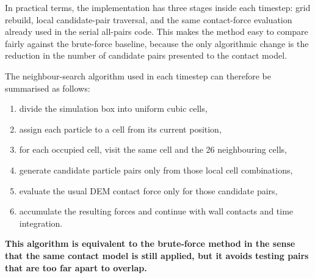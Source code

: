 \documentclass[conference]{IEEEtran}
\begin{document}
In practical terms, the implementation has three stages inside each timestep: grid rebuild, local candidate-pair traversal, and the same contact-force evaluation already used in the serial all-pairs code. This makes the method easy to compare fairly against the brute-force baseline, because the only algorithmic change is the reduction in the number of candidate pairs presented to the contact model.

The neighbour-search algorithm used in each timestep can therefore be summarised as follows:
\begin{enumerate}
\item divide the simulation box into uniform cubic cells,
\item assign each particle to a cell from its current position,
\item for each occupied cell, visit the same cell and the 26 neighbouring cells,
\item generate candidate particle pairs only from those local cell combinations,
\item evaluate the usual DEM contact force only for those candidate pairs,
\item accumulate the resulting forces and continue with wall contacts and time integration.
\end{enumerate}

\textbf{This algorithm is equivalent to the brute-force method in the sense that the same contact model is still applied, but it avoids testing pairs that are too far apart to overlap.}

\begin{table}[t]
    \centering
    \scriptsize
    \caption{Brute-force versus neighbour-grid comparison for three particle counts.}
    \label{tab:neighbor}
    \setlength{\tabcolsep}{3pt}
\end{table}
\end{document}
